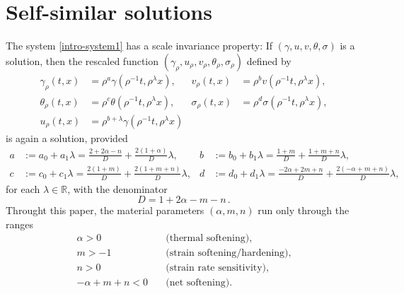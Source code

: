 \documentclass[a4paper,11pt]{article}
\theoremstyle{remark}
\begin{document}
\vfil\eject

\section{Self-similar solutions} \label{sec:scale}

The system \eqref{intro-system1} has a scale invariance property: If $(\gamma,u,v,\theta,\sigma)$ is a solution, then the rescaled function 
$(\gamma_\rho,u_\rho,v_\rho,\theta_\rho,\sigma_\rho)$ defined by
\begin{equation}\label{eq:scale}
\begin{aligned}
 \gamma_\rho(t,x) &= \rho^a\gamma(\rho^{-1}t,\rho^\lambda x), &
 v_\rho(t,x) &= \rho^bv(\rho^{-1}t,\rho^\lambda x),\\
 \theta_\rho(t,x) &= \rho^c\theta(\rho^{-1}t,\rho^\lambda x), &
 \sigma_\rho(t,x) &= \rho^d\sigma(\rho^{-1}t,\rho^\lambda x),\\
 u_\rho(t,x) &= \rho^{b+\lambda}\gamma(\rho^{-1}t,\rho^\lambda x)
\end{aligned}
\end{equation}
is again a solution, provided
\begin{equation} \label{eq:exponents}
\begin{aligned}
 a&:= a_0 + a_1 \lambda=\frac{2+2\alpha-n}{D} + \frac{2(1 + \alpha)}{D}\lambda, & b&:=b_0 + b_1\lambda=\frac{1+m}{D} + \frac{1+m+n}{D}\lambda ,\\
 c&:=c_0 + c_1\lambda=\frac{2(1+m)}{D} + \frac{2(1+m+n)}{D}\lambda, & d&:=d_0 + d_1\lambda=\frac{-2\alpha + 2m +n}{D} + \frac{2(-\alpha+m+n)}{D}\lambda,
\end{aligned}
\end{equation}
for each $\lambda \in \mathbb{R}$, with the denominator 
\begin{equation}
\label{defD}
D = 1+2\alpha-m-n \, .
\end{equation}
Throught this paper, the material parameters $(\alpha,m,n)$ run only through the ranges
\begin{equation}
 \begin{aligned}
  \alpha>0\quad&\text{(thermal softening)},\\
  m>-1 \quad&\text{(strain softening/hardening)}, \\%
  n>0 \quad&\text{(strain rate sensitivity)},\\ %
  -\alpha+m+n<0 \quad&\text{(net softening)}. \\%
\end{aligned}\label{eq:paramrange}
\end{equation}
\end{document}
